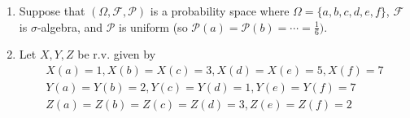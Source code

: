 \documentclass[12pt,twoside, letter]{exam}
\theoremstyle{definition}
\begin{document}
\begin{enumerate}
  \item Suppose that $(\Omega, \mathcal{F}, \mathcal{P})$ is a probability space where $\Omega = \{a,b,c,d,e,f\}$,
    $\mathcal{F}$ is $\sigma$-algebra, and $\mathcal{P}$ is uniform (so $\mathcal{P}(a) = \mathcal{P}(b) = \cdots = \frac{1}{6})$.
  \item Let $X, Y, Z$ be r.v. given by
    \begin{multline*}
      X(a) = 1, X(b) = X(c) = 3, X(d) = X(e) = 5, X(f) = 7 \\
      Y(a) = Y(b) = 2, Y(c) = Y(d) = 1, Y(e) = Y(f) = 7 \\
      Z(a) = Z(b) = Z(c) = Z(d) = 3, Z(e) = Z(f) = 2
    \end{multline*}
\end{enumerate}
\end{document}
